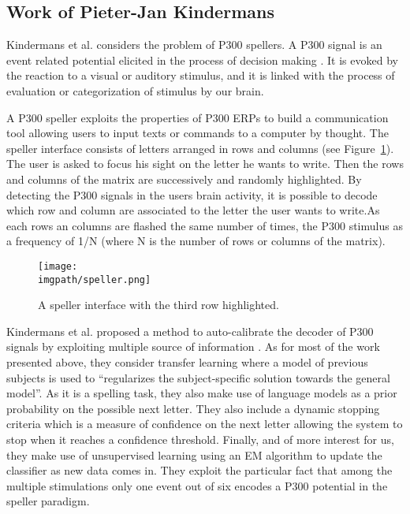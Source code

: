 \subsection{Work of Pieter-Jan Kindermans}
\label{chapter:related:bci:kindermans}

Kindermans et al. considers the problem of P300 spellers. A P300 signal is an event related potential elicited in the process of decision making \cite{polich2003theoretical}. It is evoked by the reaction to a visual or auditory stimulus, and it is linked with the process of evaluation or categorization of stimulus by our brain. 

A P300 speller exploits the properties of P300 ERPs to build a communication tool allowing users to input texts or commands to a computer by thought. The speller interface consists of letters arranged in rows and columns (see Figure~\ref{fig:speller}). The user is asked to focus his sight on the letter he wants to write. Then the rows and columns of the matrix are successively and randomly highlighted. By detecting the P300 signals in the users brain activity, it is possible to decode which row and column are associated to the letter the user wants to write.As each rows an columns are flashed the same number of times, the P300 stimulus as a frequency of 1/N (where N is the number of rows or columns of the matrix).

\begin{figure}[!htbp]
  \centering
  \texttt{[image: \\imgpath/speller.png]}
  \caption{A speller interface with the third row highlighted.}
  \label{fig:speller}
\end{figure}

Kindermans et al. proposed a method to auto-calibrate the decoder of P300 signals by exploiting multiple source of information \cite{kindermans2012b,kindermans2014integrating}. As for most of the work presented above, they consider transfer learning where a model of previous subjects is used to ``regularizes the subject-specific solution towards the general model''. As it is a spelling task, they also make use of language models as a prior probability on the possible next letter. They also include a dynamic stopping criteria which is a measure of confidence on the next letter allowing the system to stop when it reaches a confidence threshold. Finally, and of more interest for us, they make use of unsupervised learning using an EM algorithm to update the classifier as new data comes in. They exploit the particular fact that among the multiple stimulations only one event out of six encodes a P300 potential in the speller paradigm.

